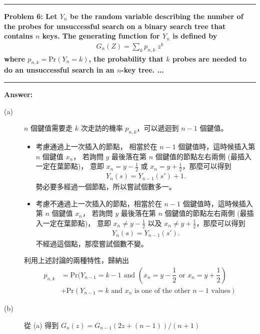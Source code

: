 \documentclass[11pt,fleqn]{article}
\newcommand\question[2]{\vspace{.25in}\hrule\textbf{#1: #2}\vspace{.5em}\hrule\vspace{.10in}}
\renewcommand\part[1]{\vspace{.10in}\textbf{#1}}
\begin{document}
\newpage

\question{Problem 6} {Let $Y_n$ be the random variable describing the number of the probes
	for unsuccessful search on a binary search tree that contains $n$ keys.
	The generating function for $Y_n$ is defined by
	\begin{align*}
		G_{n}(Z) = \sum_{k} p_{n,k} \; z^k
	\end{align*}
	where $p_{n,k} = \text{Pr}(Y_n = k)$, the probability that $k$ probes are needed to 
	do an unsuccessful search in an $n$-key tree. ...
}

\part{Answer:}

\begin{description}
	\item[(a)] $n$ 個鍵值需要走 $k$ 次走訪的機率 $p_{n,k}$，可以遞迴到 $n-1$ 個鍵值。
		\begin{itemize}
			\item 考慮通過上一次插入的節點，
				相當於在 $n-1$ 個鍵值時，這時候插入第 $n$ 個鍵值 $x_n$，
				若詢問 $y$ 最後落在第 $n$ 個鍵值的節點左右兩側 (最插入一定在葉節點)，
				意即 $x_n = y - \frac{1}{2}$ 或 $x_n = y + \frac{1}{2}$，那麼可以得到 
				\begin{align*}
					Y_n(s) = Y_{n-1}(s') + 1.
				\end{align*}
				勢必要多經過一個節點，所以嘗試個數多一。
			\item 考慮不通過上一次插入的節點，相當於在 $n-1$ 個鍵值時，這時候插入第 $n$ 個鍵值 $x_n$，
				若詢問 $y$ 最後落在第 $n$ 個鍵值的節點左右兩側 (最插入一定在葉節點)，
				意即 $x_n \neq y - \frac{1}{2}$ 以及 $x_n \neq y + \frac{1}{2}$，那麼可以得到 
				\begin{align*}
					Y_n(s) = Y_{n-1}(s').
				\end{align*}
				不經過這個點，那麼嘗試個數不變。
		\end{itemize}
		利用上述討論的兩種特性，歸納出
		\begin{align*}
			p_{n,k} &= \text{Pr}(Y_{n-1} = k-1 \text{ and } (x_n = y - \dfrac{1}{2} \text{ or } x_n = y + \dfrac{1}{2}) \\
					& + \text{Pr}(Y_{n-1} = k \text{ and } x_n \text{ is one of the other } n-1 \text{ values}) 
		\end{align*}
	\item[(b)] 從 (a) 得到 $G_n(z) = G_{n-1} (2 z + (n-1)) / (n+1)$
		\begin{align*}

\end{align*}
\end{description}
\end{document}
